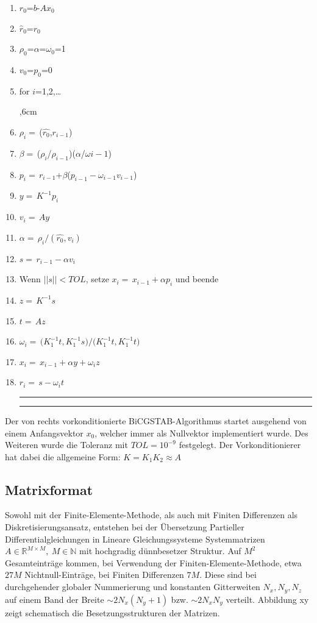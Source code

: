\begin{enumerate}
	\setlength{\itemsep}{-6pt}
\hrule\hrule
	
	
	\item $r_0$=$b$-$A$$x_0$
	\item $\hat{r}_0$=$r_0$
	\item $\rho_0$=$\alpha$=$\omega_0$=1
	\item $v_0$=$p_0$=0
	\item for $i$=1,2,\dots
	\par
	\begingroup
	,6cm 
	\noindent 
	\item$\rho_i=$\,($\hat{r_0}$,$r_{i-1}$)
	\item$\beta=$\,($\rho_i$/$\rho_{i-1}$)($\alpha$/$\omega{i-1}$)
	\item$p_i=$\,$r_{i-1}$+$\beta$($p_{i-1}-\omega_{i-1}v_{i-1}$)	
	\item$y=$\,$K^{-1}p_i$
	\item$v_i=$\,$Ay$
	\item$\alpha=$\,$\rho_i/(\hat{r_0},v_i)$
	\item$s=$\,$r_{i-1}-\alpha$$v_i$
	\item Wenn $||s|| < TOL$, setze $x_i=$\,$x_{i-1}+\alpha$$p_i$ und beende 
	\item$z=$\,$K^{-1}s$
	\item$t=$\,$Az$
	\item$\omega_i=$\,$(K^{-1}_1$$t,K^{-1}_1$$s)/(K^{-1}_1$$t,K^{-1}_1$$t)$ 
	\item$x_i=$\,$x_{i-1}+\alpha$$y+\omega_i$$z$
	\item$r_i=$\,$s-\omega_i$$t$\\
	
	\hrule\hrule
	\par
	\endgroup 
	
\end{enumerate}



Der von rechts vorkonditionierte BiCGSTAB-Algorithmus \cite{BiCGSTAB} startet ausgehend von einem Anfangsvektor $x_0$, welcher immer als Nullvektor implementiert wurde. Des Weiteren wurde die Toleranz mit $TOL= 10^{-9}$ festgelegt. Der Vorkonditionierer hat dabei die allgemeine Form: 
$K = K_1 K_2 \approx A $

\subsection{Matrixformat}

Sowohl mit der Finite-Elemente-Methode, als auch mit Finiten Differenzen als Diskretisierungsansatz, entstehen bei der Übersetzung Partieller Differentialgleichungen in Lineare Gleichungssysteme Systemmatrizen $A \in \mathbb{R}^{M \times M},~M \in \mathbb{N}$  mit hochgradig dünnbesetzer Struktur. Auf $M^2$ Gesamteinträge kommen, bei Verwendung der Finiten-Elemente-Methode, etwa $27M$ Nichtnull-Einträge, bei Finiten Differenzen $7M$. Diese sind bei durchgehender globaler Nummerierung und konstanten Gitterweiten $N_x,N_y,N_z$ auf einem Band der Breite $\sim 2 N_x (N_y+1)$ bzw. $\sim 2 N_xN_y$ verteilt. Abbildung xy zeigt schematisch die Besetzungsstrukturen der Matrizen.\\

